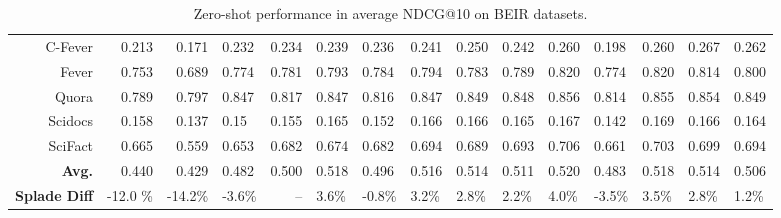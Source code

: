 \begin{table*}[h]
{\begin{tabular}{r r r lr  |lllll|lllll}
                {C-Fever}	& 0.213 & 0.171  &  0.232&0.234 & {0.239} &0.236&  0.241 & 0.250 & 0.242 & 0.260 &0.198 &0.260 &0.267& 0.262\\
                {Fever} & 0.753  &0.689  &	 0.774& {0.781} & 0.793 &0.784&  0.794 & 0.783 & 0.789 & 0.820 &0.774 &0.820 &0.814& 0.800\\
                {Quora} & 0.789 & 0.797  &	 0.847&0.817 &	0.847 &0.816&  0.847 & 0.849 &0.848 & 0.856 &0.814 &0.855 &0.854& 0.849\\
                {Scidocs}	& 0.158 &0.137  &	 0.15&0.155 &	{0.165} &0.152&  0.166 & 0.166 & 0.165 & 0.167 &0.142 &0.169&0.166& 0.164\\
                {SciFact}	& 0.665 & 0.559  &  0.653& {0.682} & 0.674 &0.682&  0.694 & 0.689 & 0.693 & 0.706  &0.661 &0.703 &0.699& 0.694\\
                            \hline
                \textbf{Avg.} & 0.440 & 0.429  &  0.482&0.500 & 0.518 &0.496&  0.516 & 0.514 & 0.511 & 0.520 &0.483 &0.518 &0.514& 0.506\\
                \textbf{{Splade Diff}} & -12.0 \% &  -14.2\%  &	 -3.6\% &-- & 3.6\% & -0.8\% &3.2\% & 2.8\% & 2.2\% &4.0\%& -3.5\%& 3.5\%&2.8\%&1.2\%\\
            \hline\hline
		\end{tabular}
		}
	\caption{Zero-shot performance in average NDCG@10 on BEIR datasets. 
}
 \vspace*{-5mm}
	\label{tab:beir}

\end{table*}



